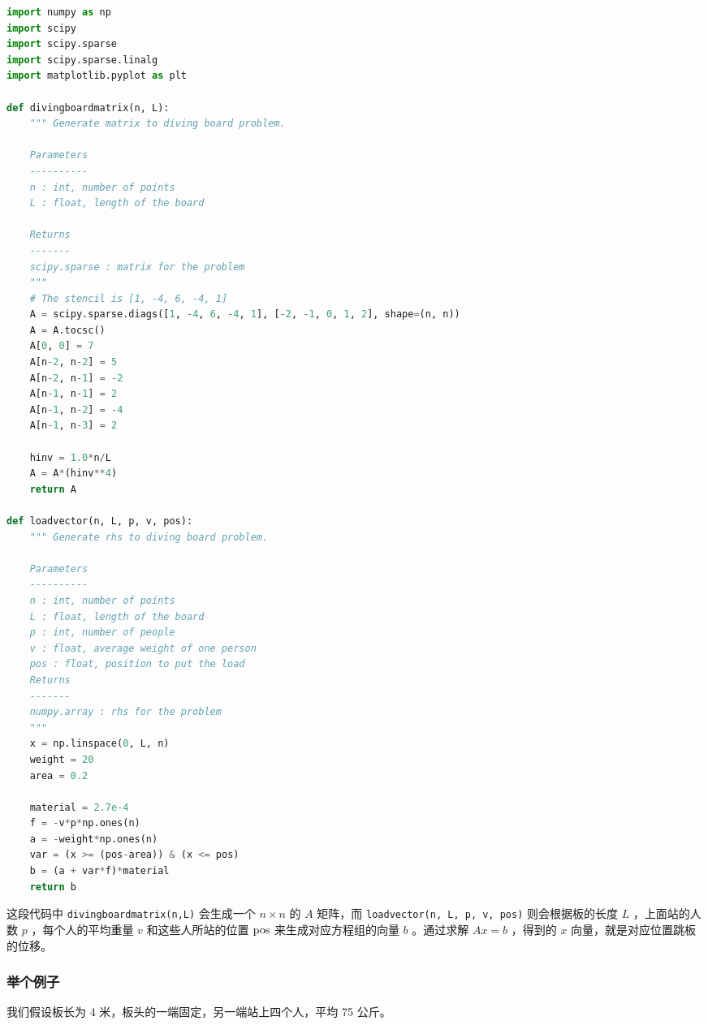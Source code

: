 \begin{lstlisting}[language=python]
import numpy as np
import scipy
import scipy.sparse  
import scipy.sparse.linalg  
import matplotlib.pyplot as plt

def divingboardmatrix(n, L):
    """ Generate matrix to diving board problem.
    
    Parameters
    ----------
    n : int, number of points 
    L : float, length of the board
        
    Returns
    -------
    scipy.sparse : matrix for the problem
    """
    # The stencil is [1, -4, 6, -4, 1]
    A = scipy.sparse.diags([1, -4, 6, -4, 1], [-2, -1, 0, 1, 2], shape=(n, n))
    A = A.tocsc()
    A[0, 0] = 7
    A[n-2, n-2] = 5
    A[n-2, n-1] = -2
    A[n-1, n-1] = 2
    A[n-1, n-2] = -4
    A[n-1, n-3] = 2
    
    hinv = 1.0*n/L
    A = A*(hinv**4)
    return A

def loadvector(n, L, p, v, pos):
    """ Generate rhs to diving board problem.
    
    Parameters
    ----------
    n : int, number of points 
    L : float, length of the board
    p : int, number of people
    v : float, average weight of one person
    pos : float, position to put the load
    Returns
    -------
    numpy.array : rhs for the problem
    """
    x = np.linspace(0, L, n)
    weight = 20
    area = 0.2
    
    material = 2.7e-4
    f = -v*p*np.ones(n)
    a = -weight*np.ones(n)
    var = (x >= (pos-area)) & (x <= pos)
    b = (a + var*f)*material
    return b
\end{lstlisting}

这段代码中 \verb|divingboardmatrix(n,L)| 会生成一个  $n\times n$  的  $A$  矩阵，而 \verb|loadvector(n, L, p, v, pos)| 则会根据板的长度  $L$  ，上面站的人数  $p$  ，每个人的平均重量  $v$  和这些人所站的位置  $\rm{pos}$  来生成对应方程组的向量  $b$  。通过求解  $Ax=b$  ，得到的  $x$  向量，就是对应位置跳板的位移。

\subsubsection{举个例子}

我们假设板长为 4 米，板头的一端固定，另一端站上四个人，平均 75 公斤。

